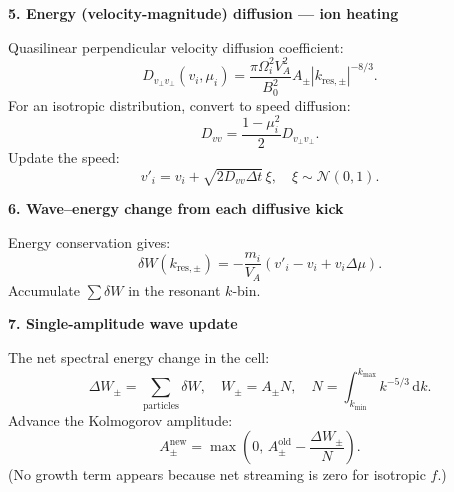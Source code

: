 \begin{tcolorbox}[colframe=black, colback=white, title=Self-Contained Monte-Carlo Recipe for Solar-Wind Ions]

\textbf{5. Energy (velocity-magnitude) diffusion — ion heating}

Quasilinear perpendicular velocity diffusion coefficient:
\[
D_{v_{\perp} v_{\perp}}(v_i, \mu_i) = \frac{\pi \Omega_i^2 V_A^2}{B_0^2} A_{\pm} |k_{\text{res},\pm}|^{-8/3}.
\tag{5}
\]
For an isotropic distribution, convert to speed diffusion:
\[
D_{vv} = \frac{1 - \mu_i^2}{2} D_{v_{\perp} v_{\perp}}.
\tag{6}
\]
Update the speed:
\[
v'_i = v_i + \sqrt{2 D_{vv} \Delta t} \, \xi, \quad \xi \sim \mathcal{N}(0, 1).
\tag{7}
\]

\bigskip

\textbf{6. Wave–energy change from each diffusive kick}

Energy conservation gives:
\[
\delta W(k_{\text{res},\pm}) = -\frac{m_i}{V_A} \left( v'_i - v_i + v_i \Delta \mu \right).
\tag{8}
\]
Accumulate \( \sum \delta W \) in the resonant \( k \)-bin.

\bigskip

\textbf{7. Single-amplitude wave update}

The net spectral energy change in the cell:
\[
\Delta W_{\pm} = \sum_{\text{particles}} \delta W, \quad W_{\pm} = A_{\pm} N, \quad N = \int_{k_{\min}}^{k_{\max}} k^{-5/3} \, \mathrm{d}k.
\]
Advance the Kolmogorov amplitude:
\[
A_{\pm}^{\text{new}} = \max \left( 0, \, A_{\pm}^{\text{old}} - \frac{\Delta W_{\pm}}{N} \right).
\tag{9}
\]
(No growth term appears because net streaming is zero for isotropic \( f \).)

\bigskip

\end{tcolorbox}
